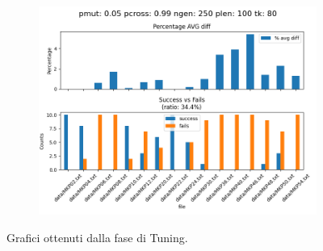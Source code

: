 \begin{figure}[H]
    \begin{subfigure}{.5\textwidth}
        \includegraphics[width=\textwidth]{img/eval/evaluation_results_5_99_250_100_80.png}
    \end{subfigure}

    \caption{Grafici ottenuti dalla fase di Tuning.}
\end{figure}
